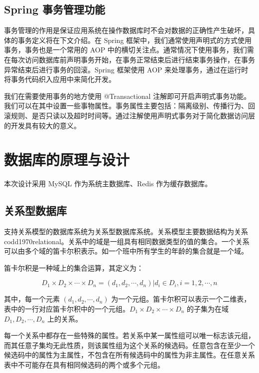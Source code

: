  \subsection{Spring 事务管理功能}
 
 事务管理的作用是保证应用系统在操作数据库时不会对数据的正确性产生破坏，具体的事务定义将在下文介绍。在 Spring 框架中，我们通常使用声明式的方式使用事务，事务也是一个常用的 AOP 中的横切关注点。通常情况下使用事务，我们需在每次访问数据库前声明事务开始，在事务正常结束后进行结束事务操作，在事务异常结束后进行事务的回滚。Spring 框架使用 AOP 来处理事务，通过在运行时将事务代码织入应用中来简化开发\cite{spring2019,walls2005spring}。
 
 我们在需要使用事务的地方使用 @Transactional\cite{spring2019} 注解即可开启声明式事务功能。我们可以在其中设置一些事物属性。事务属性主要包括：隔离级别、传播行为、回滚规则、是否只读以及超时时间等。通过注解使用声明式事务对于简化数据访问层的开发具有较大的意义\cite{walls2016spring}。


\section{数据库的原理与设计}

本次设计采用 MySQL 作为系统主数据库、Redis 作为缓存数据库。


\subsection{关系型数据库}
支持关系模型的数据库系统为关系型数据库系统。关系模型主要数据结构为关系{codd1970relational}。关系中的域是一组具有相同数据类型的值的集合。一个关系可以由多个域的笛卡尔积表示。如一个班中所有学生的年龄的集合就是一个域\cite{王珊2006数据库系统概论}。

笛卡尔积是一种域上的集合运算，其定义为：

\begin{equation}
\label{eq:Descartes}
D_1 \times D_2 \times \cdots \times D_n = {(d_1, d_2, \cdots, d_n) | d_i \in D_i, i=1, 2, \cdots, n}
\end{equation}

其中，每一个元素 $(d_1, d_2, \cdots, d_n)$ 为一个元组。笛卡尔积可以表示一个二维表，表中的一行对应笛卡尔积中的一个元组。$D_1 \times D_2 \times \cdots \times D_n$ 的子集为在域 $D_1, D_2, \cdots, D_n$ 上的关系\cite{codd1970relational}。

每一个关系中都存在一些特殊的属性。若关系中某一属性组可以唯一标志该元组，而其任意子集均无此性质，则该属性组为这个关系的候选码。任意包含在至少一个候选码中的属性为主属性，不包含在所有候选码中的属性为非主属性。在任意关系表中不可能存在具有相同候选码的两个或多个元组\cite{codd1970relational,王珊2006数据库系统概论}。


